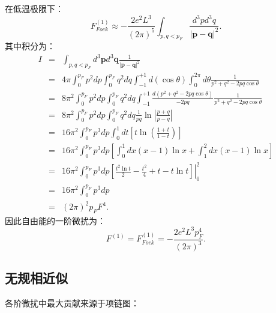 \documentclass[10pt,UTF8]{ctexart}
\begin{document}
在低温极限下：
\begin{equation}
	F_{Fock}^{\left(1\right)}\approx-\frac{2e^{2}L^{3}}{\left(2\pi\right)^{5}}\int_{p,q<p_F}\frac{d^{3}pd^{3}q}{\left|\bm{p}-\bm{q}\right|^{2}}.
\end{equation}
其中积分为：
\begin{eqnarray}
	I 
	& = & \int_{p,q<p_F}d^{3}\bm{p}d^{3}\bm{q}\frac{1}{\left|\bm{p}-\bm{q}\right|^{2}}\\
 	& = & 4\pi\int_{0}^{p_F}p^{2}dp\int_{0}^{p_F}q^{2}dq\int_{-1}^{+1}d\left(\cos\theta\right)\int_{0}^{2\pi}d\theta\frac{1}{p^{2}+q^{2}-2pq\cos\theta}\\
 	& = & 8\pi^{2}\int_{0}^{p_F}p^{2}dp\int_{0}^{p_F}q^{2}dq\int_{-1}^{+1}\frac{d\left(p^{2}+q^{2}-2pq\cos\theta\right)}{-2pq}\frac{1}{p^{2}+q^{2}-2pq\cos\theta}\\
 	& = & 8\pi^{2}\int_{0}^{p_F}p^{2}dp\int_{0}^{p_F}q^{2}dq\frac{1}{pq}\ln\left|\frac{p+q}{p-q}\right|\\
 	& = & 16\pi^{2}\int_{0}^{p_F}p^{3}dp\int_{0}^{1}dt\left[t\ln\left(\frac{1+t}{1-t}\right)\right]\\
 	& = & 16\pi^{2}\int_{0}^{p_F}p^{3}dp\left[\int_{0}^{1}dx\left(x-1\right)\ln x+\int_{1}^{2}dx\left(x-1\right)\ln x\right]\\
 	& = & 16\pi^{2}\int_{0}^{p_F}p^{3}dp\left.\left[\frac{t^{2}\ln t}{2}-\frac{t^{2}}{4}+t-t\ln t\right]\right|_{0}^{2}\\
 	& = & 16\pi^{2}\int_{0}^{p_F}p^{3}dp\\
 	& = & \left(2\pi\right)^{2}p_F{F}^{4}.
\end{eqnarray}
因此自由能的一阶微扰为：
\begin{equation}
	F^{\left(1\right)}=F_{Fock}^{\left(1\right)}=-\frac{2e^{2}L^{3}p_F^{4}}{\left(2\pi\right)^{3}}.
\end{equation}



\subsection*{无规相近似}
\noindent
各阶微扰中最大贡献来源于项链图：
\end{document}
